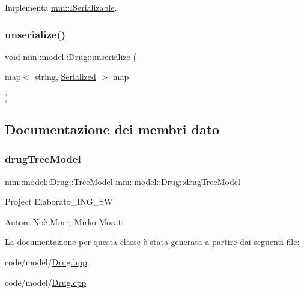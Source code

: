 Implementa \mbox{\hyperlink{classmm_1_1_i_serializable_a20a59e2324c8dbf6fefe4d11ae89d0fb}{mm\+::\+I\+Serializable}}.

\mbox{\label{classmm_1_1model_1_1_drug_adc9cd19eb2d0c3c271c01c41cf10d600}} 
\subsubsection{\texorpdfstring{unserialize()}{unserialize()}}
{\footnotesize\ttfamily void mm\+::model\+::\+Drug\+::unserialize (\begin{DoxyParamCaption}\item[{map$<$ string, \mbox{\hyperlink{structmm_1_1_serialized}{Serialized}} $>$}]{map }\end{DoxyParamCaption})\hspace{0.3cm}{\ttfamily [override]}}



\subsection{Documentazione dei membri dato}
\mbox{\label{classmm_1_1model_1_1_drug_a9169612d0fc3b3b25063a1686be30af9}} 
\subsubsection{\texorpdfstring{drug\+Tree\+Model}{drugTreeModel}}
{\footnotesize\ttfamily \mbox{\hyperlink{structmm_1_1model_1_1_drug_1_1_tree_model}{mm\+::model\+::\+Drug\+::\+Tree\+Model}} mm\+::model\+::\+Drug\+::drug\+Tree\+Model\hspace{0.3cm}{\ttfamily [static]}}

Project Elaborato\+\_\+\+I\+N\+G\+\_\+\+SW \begin{DoxyAuthor}{Autore}
Noè Murr, Mirko Morati 
\end{DoxyAuthor}


La documentazione per questa classe è stata generata a partire dai seguenti file\+:\begin{DoxyCompactItemize}
\item 
code/model/\mbox{\hyperlink{_drug_8hpp}{Drug.\+hpp}}\item 
code/model/\mbox{\hyperlink{_drug_8cpp}{Drug.\+cpp}}\end{DoxyCompactItemize}
